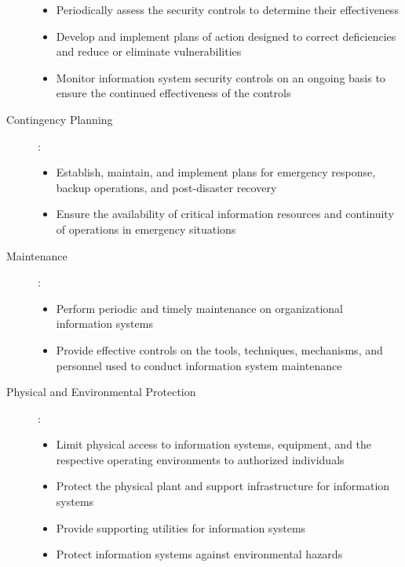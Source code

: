 \documentclass{article}
\begin{document}
\begin{description}
\begin{itemize}
                                \item Periodically assess the security controls to determine their effectiveness
                                \item Develop and implement plans of action designed to correct deficiencies and reduce or eliminate vulnerabilities
                                \item Monitor information system security controls on an ongoing basis to ensure the continued effectiveness of the controls
                            \end{itemize}
                            \item[Contingency Planning]:  
                            \begin{itemize}
                                \item Establish, maintain, and implement plans for emergency response, backup operations, and post-disaster recovery
                                \item Ensure the availability of critical information resources and continuity of operations in emergency situations
                            \end{itemize}
                            \item[Maintenance]: 
                            \begin{itemize}
                                \item Perform periodic and timely maintenance on organizational information systems
                                \item Provide effective controls on the tools, techniques, mechanisms, and personnel used to conduct information system maintenance
                            \end{itemize}
                            \item [Physical and Environmental Protection]:
                            \begin{itemize}
                                \item Limit physical access to information systems, equipment, and the respective operating environments to authorized individuals
                                \item Protect the physical plant and support infrastructure for information systems
                                \item Provide supporting utilities for information systems
                                \item Protect information systems against environmental hazards

\end{itemize}
\end{description}
\end{document}
